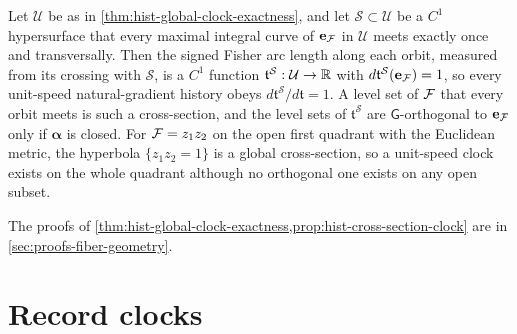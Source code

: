Let $\mathcal U$ be as in \cref{thm:hist-global-clock-exactness}, and let
$\mathcal S\subset\mathcal U$ be a $C^1$ hypersurface that every maximal integral curve
of $\mathbf e_{\mathcal F}$ in $\mathcal U$ meets exactly once and transversally.  Then the
signed Fisher arc length along each orbit, measured from its crossing with $\mathcal S$,
is a $C^1$ function $\mathfrak t^{\mathcal S}:\mathcal U\to\mathbb R$ with
$d\mathfrak t^{\mathcal S}(\mathbf e_{\mathcal F})=1$, so every unit-speed natural-gradient
history obeys $d\mathfrak t^{\mathcal S}/d\mathfrak t=1$.  A level set of $\mathcal F$ that
every orbit meets is such a cross-section, and the level sets of
$\mathfrak t^{\mathcal S}$ are $\mathsf G$-orthogonal to $\mathbf e_{\mathcal F}$ only if
$\bm\alpha$ is closed.  For $\mathcal F=z_1z_2$ on the open first quadrant with the
Euclidean metric, the hyperbola $\{z_1z_2=1\}$ is a global cross-section, so a unit-speed
clock exists on the whole quadrant although no orthogonal one exists on any open subset.

The proofs of \cref{thm:hist-global-clock-exactness,prop:hist-cross-section-clock} are in
\cref{sec:proofs-fiber-geometry}.

\section{Record clocks}
\label{sec:hist-record-clocks}

